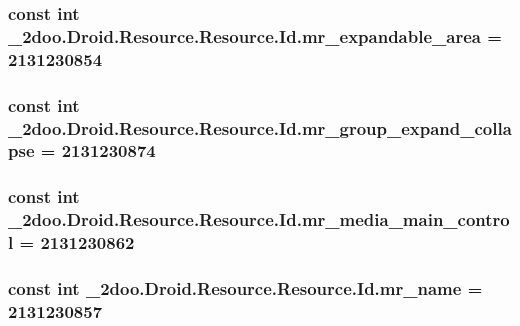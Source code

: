 \hypertarget{class__2doo_1_1_droid_1_1_resource_1_1_id_cffd49c74991c694492cdc4eb9d2dd2c}{
\subsubsection[{mr\_\-expandable\_\-area}]{\setlength{\rightskip}{0pt plus 5cm}const int \_\-2doo.Droid.Resource.Resource.Id.mr\_\-expandable\_\-area = 2131230854}}
\label{class__2doo_1_1_droid_1_1_resource_1_1_id_cffd49c74991c694492cdc4eb9d2dd2c}


\hypertarget{class__2doo_1_1_droid_1_1_resource_1_1_id_a403893a07cfbd81f2cd23ea854ccb99}{
\subsubsection[{mr\_\-group\_\-expand\_\-collapse}]{\setlength{\rightskip}{0pt plus 5cm}const int \_\-2doo.Droid.Resource.Resource.Id.mr\_\-group\_\-expand\_\-collapse = 2131230874}}
\label{class__2doo_1_1_droid_1_1_resource_1_1_id_a403893a07cfbd81f2cd23ea854ccb99}


\hypertarget{class__2doo_1_1_droid_1_1_resource_1_1_id_5a4c0cd7b4d7bec6eb43e226d4749e0f}{
\subsubsection[{mr\_\-media\_\-main\_\-control}]{\setlength{\rightskip}{0pt plus 5cm}const int \_\-2doo.Droid.Resource.Resource.Id.mr\_\-media\_\-main\_\-control = 2131230862}}
\label{class__2doo_1_1_droid_1_1_resource_1_1_id_5a4c0cd7b4d7bec6eb43e226d4749e0f}


\hypertarget{class__2doo_1_1_droid_1_1_resource_1_1_id_345eec58774808e9d06676993e11886a}{
\subsubsection[{mr\_\-name}]{\setlength{\rightskip}{0pt plus 5cm}const int \_\-2doo.Droid.Resource.Resource.Id.mr\_\-name = 2131230857}}
\label{class__2doo_1_1_droid_1_1_resource_1_1_id_345eec58774808e9d06676993e11886a}


